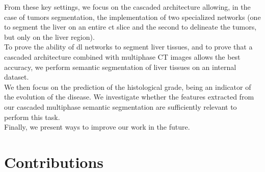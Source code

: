 From these key settings, we focus on the cascaded architecture allowing,
in the case of tumors segmentation, the implementation of two specialized
networks (one to segment the liver on an entire \ac{ct} slice and the second to delineate the
tumors, but only on the liver region).\\
To prove the ability of \ac{dl} networks to segment liver tissues, and to
prove that a cascaded architecture combined with multiphase CT images
allows the best accuracy, we perform semantic segmentation of liver
tissues on an internal dataset.\\
We then focus on the prediction of the histological grade, being
an indicator of the evolution of the disease. We investigate whether the
features extracted from our cascaded multiphase semantic segmentation
are sufficiently relevant to perform this task. \\
Finally, we present ways to improve our work in the future.








\section*{Contributions}
\label{sec:IntroContributions}

